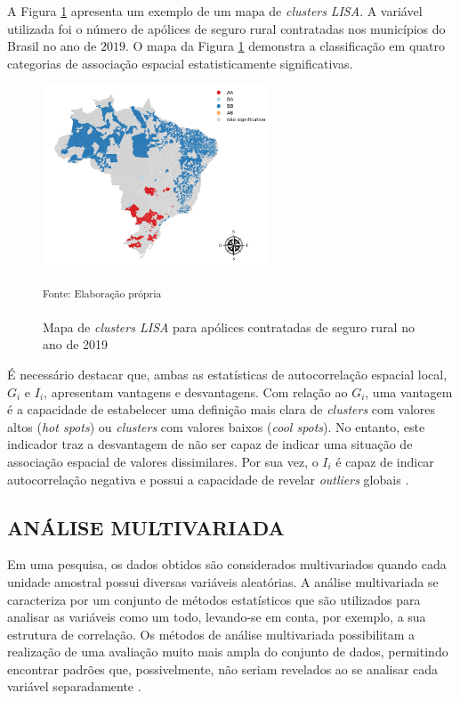 \documentclass[12pt,a4paper]{article}
\begin{document}
	
A Figura \ref{lisa_ex_2} apresenta um exemplo de um mapa de \textit{clusters} \textit{LISA}. A variável utilizada foi o número de apólices de seguro rural contratadas nos municípios do Brasil no ano de $2019$. O mapa da Figura \ref{lisa_ex_2} demonstra a classificação em quatro categorias de associação espacial estatisticamente significativas. 
	
\begin{figure}[H]
	\centering
	\caption{Mapa de \textit{clusters LISA} para apólices contratadas de seguro rural no ano de 2019}
	\includegraphics[width=0.6\textwidth]{figuras/map_lisa_ex.png}
	\parbox{\dimexpr\linewidth-1.5cm}{\raggedright
    \strut \textsuperscript{Fonte: Elaboração própria}\strut}
    \label{lisa_ex_2}
\end{figure}
	
É necessário destacar que, ambas as estatísticas de autocorrelação espacial local, $G_i$ e $I_i$, apresentam vantagens e desvantagens. Com relação ao $G_i$, uma vantagem é a capacidade  de estabelecer uma definição mais clara de \textit{clusters} com valores altos  (\textit{hot spots}) ou \textit{clusters} com valores baixos (\textit{cool spots}). No entanto, este indicador traz a desvantagem de não ser capaz de indicar uma situação de associação espacial de valores dissimilares. Por sua vez, o $I_i$ é capaz de indicar autocorrelação negativa e possui a capacidade de revelar \textit{outliers} globais \cite{darmofal06}.


\subsection{ANÁLISE MULTIVARIADA}
	
Em uma pesquisa, os dados obtidos são considerados multivariados quando cada unidade amostral possui diversas variáveis aleatórias. A análise multivariada se caracteriza por um conjunto de métodos estatísticos que são utilizados para analisar as variáveis como um todo, levando-se em conta, por exemplo, a sua estrutura de correlação. Os métodos de análise multivariada possibilitam a realização de  uma avaliação muito mais ampla do conjunto de dados, permitindo encontrar padrões que, possivelmente, não seriam revelados ao se analisar cada variável separadamente \cite{mingoti10}. 
	
\end{document}
